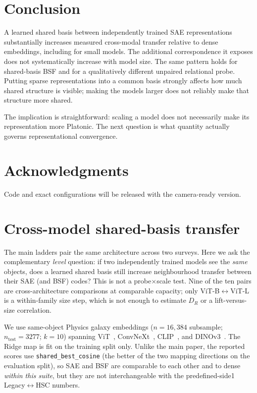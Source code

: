 \documentclass[11pt]{article}
\begin{document}
\section{Conclusion}
\label{sec:conc}

A learned shared basis between independently trained SAE representations substantially increases measured cross-modal transfer relative to dense embeddings, including for small models.
The additional correspondence it exposes does not systematically increase with model size.
The same pattern holds for shared-basis BSF and for a qualitatively different unpaired relational probe.
Putting sparse representations into a common basis strongly affects how much shared structure is visible; making the models larger does not reliably make that structure more shared.

The implication is straightforward: scaling a model does not necessarily make its representation more Platonic.
The next question is what quantity actually governs representational convergence.

\section*{Acknowledgments}
Code and exact configurations will be released with the camera-ready version.




\appendix
\section{Cross-model shared-basis transfer}
\label{app:cross-model}

The main ladders pair the same architecture across two surveys.
Here we ask the complementary \emph{level} question: if two independently trained models see the \emph{same} objects, does a learned shared basis still increase neighbourhood transfer between their SAE (and BSF) codes?
This is not a probe\(\times\)scale test.
Nine of the ten pairs are cross-architecture comparisons at comparable capacity; only ViT-B\(\leftrightarrow\)ViT-L is a within-family size step, which is not enough to estimate \(D_R\) or a lift-versus-size correlation.

We use same-object Physics galaxy embeddings (\(n{=}16{,}384\) subsample; \(n_{\mathrm{test}}{=}3277\); \(k{=}10\)) spanning ViT~\citep{dosovitskiy2021vit}, ConvNeXt~\citep{woo2023convnextv2}, CLIP~\citep{radford2021clip}, and DINOv3~\citep{simeoni2025dinov3}.
The Ridge map is fit on the training split only.
Unlike the main paper, the reported scores use \texttt{shared\_best\_cosine} (the better of the two mapping directions on the evaluation split), so SAE and BSF are comparable to each other and to dense \emph{within this suite}, but they are not interchangeable with the predefined-side1 Legacy\(\leftrightarrow\)HSC numbers.
\end{document}
